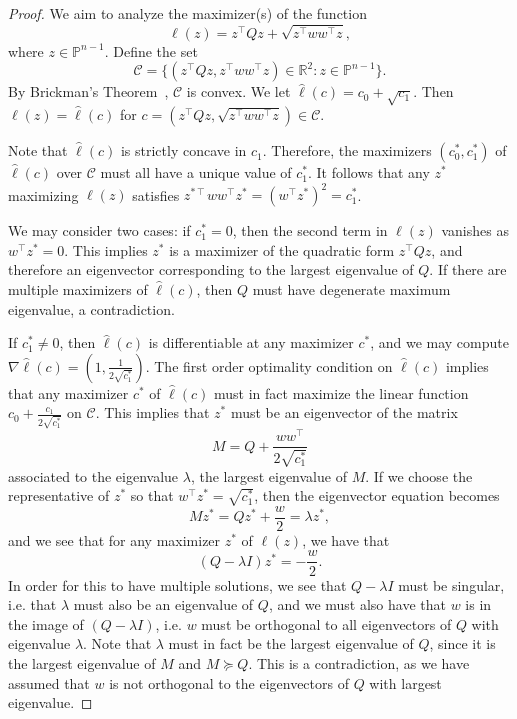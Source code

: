 \documentclass{article}
\numberwithin{equation}{section}
\newcommand{\PP}{\mathbb{P}}
\newcommand{\cC}{\mathcal{C}}
\begin{document}
\begin{proof}


We aim to analyze the maximizer(s) of the function 
    \[
        \ell(z) = z^{\intercal}Qz + \sqrt{z^{\intercal}ww^{\intercal}z},
    \]
where $z\in \PP^{n-1}$. 
Define the set
    \[
        \cC = \{(z^{\intercal}Qz, z^{\intercal}ww^{\intercal}z) \in \mathbb{R}^2 : z \in \PP^{n-1}\}.
    \]
By Brickman's Theorem~\cite[Theorem 14.1]{barvinok}, $\cC$ is convex.
We let $\hat\ell(c)=c_0+\sqrt{c_1}$. 
Then $\ell(z)=\hat \ell(c)$ for $c=(z^{\intercal}Qz , \sqrt{z^{\intercal}ww^{\intercal}z})\in \cC$.

Note that $\hat \ell(c)$ is strictly concave in $c_1$. Therefore, 
the maximizers $(c_0^*,c_1^*)$ of $\hat \ell(c)$ over $\cC$ must all have a unique value of $c_1^*$.
It follows that any $z^*$ maximizing $\ell(z)$ 
satisfies
$z^{*\intercal}ww^{\intercal}z^* = (w^{\intercal}z^*)^2 = c_1^*$.

    We may consider two cases: 
if $c_1^* = 0$, then the second term in $\ell(z)$ vanishes as 
 $w^{\intercal}z^* = 0$.
This implies $z^*$ is a maximizer of the quadratic form $z^\intercal Qz$, and therefore an eigenvector corresponding to the largest eigenvalue of $Q$. 
If there are multiple maximizers of $\hat \ell(c)$, then $Q$ must have degenerate maximum eigenvalue, a contradiction.



If $c_1^* \neq 0$, then $\hat{\ell}(c)$ is differentiable at any maximizer $c^*$, and we may compute $\nabla \hat{\ell}(c) = \left(1, \frac{1}{2\sqrt{c_1^*}}\right)$.
The first order optimality condition on $\hat{\ell}(c)$ implies that any maximizer $c^*$ of $\hat{\ell}(c)$ must in fact maximize the linear function $ c_0 + \frac{c_1}{2\sqrt{c_1^*}}$ on $\cC$. This implies that $z^*$ must be an eigenvector of the matrix 
\[
    M = Q + \frac{ww^{\intercal}}{2\sqrt{c_1^*}}
\]
associated to the eigenvalue $\lambda$, the largest eigenvalue of $M$.
If we choose the representative of $z^*$ so that $w^{\intercal}z^* = \sqrt{c_1^*}$, 
then the eigenvector equation becomes
\[
    Mz^* = Qz^* + \frac{w}{2} = \lambda z^*,
\]
and we see that for any maximizer $z^*$ of $\ell(z)$, we have that 
\[
    (Q-\lambda I)z^* = - \frac{w}{2}.
\]
In order for this to have multiple solutions, we see that $Q-\lambda I$ must be singular, i.e. that $\lambda$ must also be an eigenvalue of $Q$, and we must also have that $w$ is in the image of $(Q-\lambda I)$, i.e. $w$ must be orthogonal to all eigenvectors of $Q$ with eigenvalue $\lambda$. Note that $\lambda$ must in fact be the largest eigenvalue of $Q$, since it is the largest eigenvalue of $M$ and $M \succeq Q$. This is a contradiction, as we have assumed that $w$ is not orthogonal to the eigenvectors of $Q$ with largest eigenvalue.
\end{proof}
\end{document}
